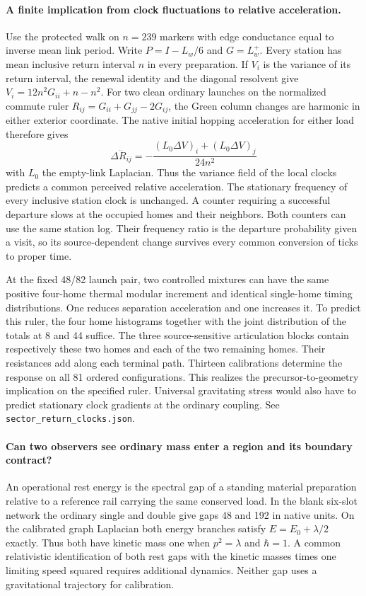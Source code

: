 \documentclass[11pt]{article}
\begin{document}
\paragraph{A finite implication from clock fluctuations to relative acceleration.}
Use the protected walk on \(n=239\) markers with edge conductance
equal to inverse mean link period. Write \(P=I-L_w/6\) and \(G=L_w^+\).
Every station has mean inclusive return interval \(n\) in every
preparation. If \(V_i\) is the variance of its return interval, the
renewal identity and the diagonal resolvent give
\(V_i=12n^2G_{ii}+n-n^2\). For two clean ordinary launches on the
normalized commute ruler \(R_{ij}=G_{ii}+G_{jj}-2G_{ij}\), the Green
column changes are harmonic in either exterior coordinate. The
native initial hopping acceleration for either load therefore gives
\[
 \Delta\ddot R_{ij}
 =-\frac{(L_0\Delta V)_i+(L_0\Delta V)_j}{24n^2}
\]
with \(L_0\) the empty-link Laplacian. Thus the variance field of the
local clocks predicts a common perceived relative acceleration.
The stationary frequency of every inclusive station clock is
unchanged. A counter requiring a successful departure slows at the
occupied homes and their neighbors. Both counters can use the same
station log. Their frequency ratio is the departure probability
given a visit, so its source-dependent change survives every common
conversion of ticks to proper time.

At the fixed 48/82 launch pair, two controlled mixtures can have the
same positive four-home thermal modular increment and identical
single-home timing distributions. One reduces separation
acceleration and one increases it. To predict this ruler, the four
home histograms together with the joint distribution of the totals at
8 and 44 suffice. The three source-sensitive articulation blocks
contain respectively these two homes and each of the two remaining
homes. Their resistances add along each terminal path. Thirteen
calibrations determine the response on all 81 ordered configurations.
This realizes the precursor-to-geometry implication on the specified
ruler. Universal gravitating stress would also have to predict
stationary clock gradients at the ordinary coupling. See
\texttt{sector\_return\_clocks.json}.

\paragraph{Can two observers see ordinary mass enter a region and its boundary contract?}
An operational rest energy is the spectral gap of a standing material
preparation relative to a reference rail carrying the same conserved
load. In the blank six-slot network the ordinary single and double
give gaps 48 and 192 in native units. On the calibrated graph
Laplacian both energy branches satisfy \(E=E_0+\lambda/2\) exactly.
Thus both have kinetic mass one when \(p^2=\lambda\) and \(\hbar=1\).
A common relativistic identification of both rest gaps with the
kinetic masses times one limiting speed squared requires additional
dynamics. Neither gap uses a gravitational trajectory for calibration.
\end{document}
